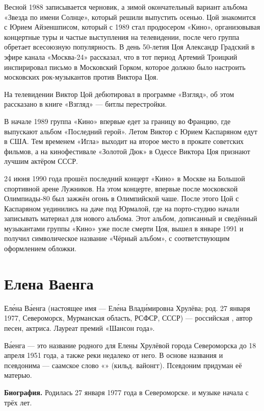 Весной 1988 записывается черновик, а зимой окончательный вариант альбома «Звезда по имени Солнце», который решили выпустить осенью. Цой знакомится с Юрием Айзеншписом, который с 1989 стал продюсером «Кино», организовывая концертные туры и частые выступления на телевидении, после чего группа обретает всесоюзную популярность. В день 50-летия Цоя Александр Градский в эфире канала «Москва-24» рассказал, что в тот период Артемий Троицкий инспирировал письмо в Московский Горком, которое должно было настроить московских рок-музыкантов против Виктора Цоя.

На телевидении Виктор Цой дебютировал в программе «Взгляд», об этом рассказано в книге «Взгляд» --- битлы перестройки.

В начале 1989 группа «Кино» впервые едет за границу во Францию, где выпускают альбом «Последний герой». Летом Виктор с Юрием Каспаряном едут в США. Тем временем «Игла» выходит на второе место в прокате советских фильмов, а на кинофестивале «Золотой Дюк» в Одессе Виктора Цоя признают лучшим актёром СССР.

24 июня 1990 года прошёл последний концерт «Кино» в Москве на Большой спортивной арене Лужников. На этом концерте, впервые после московской Олимпиады-80 был зажжён огонь в Олимпийской чаше. После этого Цой с Каспаряном уединились на даче под Юрмалой, где на порто-студию начали записывать материал для нового альбома. Этот альбом, дописанный и сведённый музыкантами группы «Кино» уже после смерти Цоя, вышел в январе 1991 и получил символическое название «Чёрный альбом», с соответствующим оформлением обложки.

\newpage
\section{Елена Ваенга}
Ел\'{е}на В\'{а}енга (настоящее имя --- Ел\'{е}на Влад\'{и}мировна Хрулёва; род. 27 января 1977, Североморск, Мурманская область, РСФСР, СССР) --- российская , автор песен, актриса. Лауреат премий «Шансон года».

В\'{а}енга --- это название родного для Елены Хрулёвой города Североморска до 18 апреля 1951 года, а также реки недалеко от него. В основе названия и псевдонима --- саамское слово «» (кильд. вайонгг). Псевдоним придуман её матерью.

\textbf{Биография.} Родилась 27 января 1977 года в Североморске.  и  музыке начала с трёх лет.

